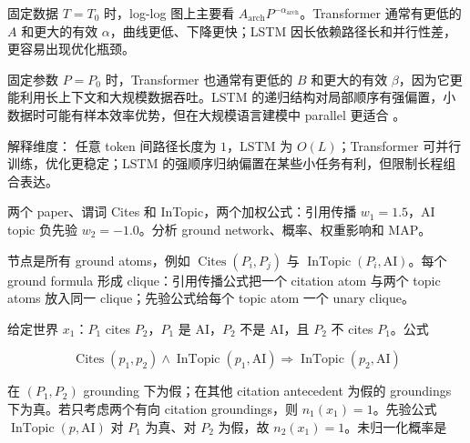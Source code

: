 \solution
固定数据 \(T=T_0\) 时，log-log 图上主要看 \(A_{\mathrm{arch}}P^{-\alpha_{\mathrm{arch}}}\)。Transformer 通常有更低的 \(A\) 和更大的有效 \(\alpha\)，曲线更低、下降更快；LSTM 因长依赖路径长和并行性差，更容易出现优化瓶颈。

固定参数 \(P=P_0\) 时，Transformer 也通常有更低的 \(B\) 和更大的有效 \(\beta\)，因为它更能利用长上下文和大规模数据吞吐。LSTM 的递归结构对局部顺序有强偏置，小数据时可能有样本效率优势，但在大规模语言建模中 parallel  更适合 。

解释维度： 任意 token 间路径长度为 \(1\)，LSTM 为 \(O(L)\)；Transformer 可并行训练，优化更稳定；LSTM 的强顺序归纳偏置在某些小任务有利，但限制长程组合表达。

\begin{examproblem}[D3：简单 MLN 分析]
两个 paper、谓词 Cites 和 InTopic，两个加权公式：引用传播 \(w_1=1.5\)，AI topic 负先验 \(w_2=-1.0\)。分析 ground network、概率、权重影响和 MAP。
\end{examproblem}

\solution
节点是所有 ground atoms，例如 \(\operatorname{Cites}(P_i,P_j)\) 与 \(\operatorname{InTopic}(P_i,\mathrm{AI})\)。每个 ground formula 形成 clique：引用传播公式把一个 citation atom 与两个 topic atoms 放入同一 clique；先验公式给每个 topic atom 一个 unary clique。

给定世界 \(x_1\)：\(P_1\) cites \(P_2\)，\(P_1\) 是 AI，\(P_2\) 不是 AI，且 \(P_2\) 不 cites \(P_1\)。公式

\[
  \operatorname{Cites}(p_1,p_2)\wedge \operatorname{InTopic}(p_1,\mathrm{AI})
  \Rightarrow
  \operatorname{InTopic}(p_2,\mathrm{AI})
\]

在 \((P_1,P_2)\) grounding 下为假；在其他 citation antecedent 为假的 groundings 下为真。若只考虑两个有向 citation groundings，则 \(n_1(x_1)=1\)。先验公式 \(\operatorname{InTopic}(p,\mathrm{AI})\) 对 \(P_1\) 为真、对 \(P_2\) 为假，故 \(n_2(x_1)=1\)。未归一化概率是

